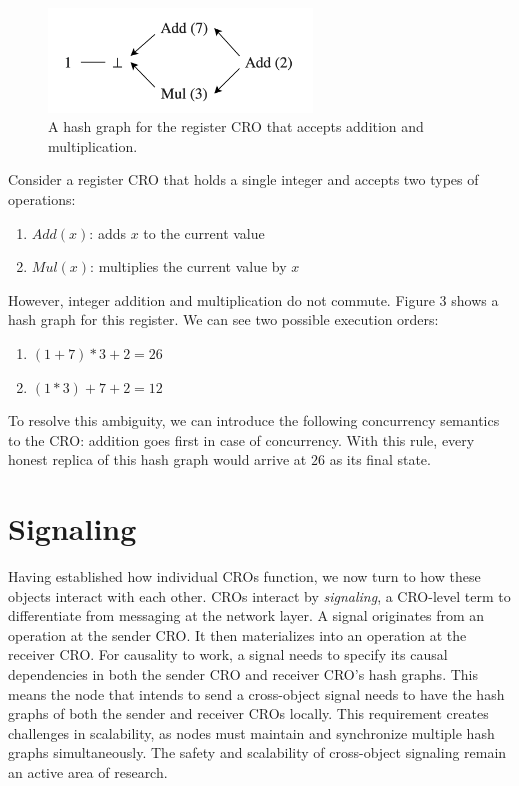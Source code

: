 \documentclass{article}
\begin{document}
\begin{figure}[htp]
    \centering
    \includegraphics[width=7cm]{fig3}
    \caption{A hash graph for the register CRO that accepts addition and multiplication.}
    \label{fig:3}
\end{figure}

Consider a register CRO that holds a single integer and accepts two types of operations:
\begin{enumerate}
    \item $Add(x)$: adds $x$ to the current value
    \item $Mul(x)$: multiplies the current value by $x$
\end{enumerate}

However, integer addition and multiplication do not commute. Figure 3 shows a hash graph for this register. We can see two possible execution orders:
\begin{enumerate}
    \item $(1+7)*3+2 = 26$
    \item $(1*3)+7+2 = 12$
\end{enumerate}

To resolve this ambiguity, we can introduce the following concurrency semantics to the CRO: addition goes first in case of concurrency. With this rule, every honest replica of this hash graph would arrive at $26$ as its final state.

\section{Signaling}
\label{sec:headings}

Having established how individual CROs function, we now turn to how these objects interact with each other. CROs interact by \textit{signaling}, a CRO-level term to differentiate from messaging at the network layer. A signal originates from an operation at the sender CRO. It then materializes into an operation at the receiver CRO. For causality to work, a signal needs to specify its causal dependencies in both the sender CRO and receiver CRO's hash graphs. This means the node that intends to send a cross-object signal needs to have the hash graphs of both the sender and receiver CROs locally. This requirement creates challenges in scalability, as nodes must maintain and synchronize multiple hash graphs simultaneously. The safety and scalability of cross-object signaling remain an active area of research.
\end{document}
